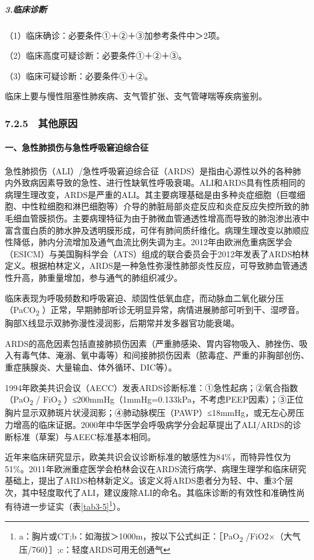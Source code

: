 \subparagraph{3.临床诊断}

（1）临床确诊：必要条件①＋②＋③加参考条件中＞2项。

（2）临床高度可疑诊断：必要条件①＋②＋③。

（3）临床可疑诊断：必要条件①＋②。

临床上要与慢性阻塞性肺疾病、支气管扩张、支气管哮喘等疾病鉴别。

\subsubsection{7.2.5　其他原因}

\paragraph{一、急性肺损伤与急性呼吸窘迫综合征}

急性肺损伤（ALI）/急性呼吸窘迫综合征（ARDS）是指由心源性以外的各种肺内外致病因素导致的急性、进行性缺氧性呼吸衰竭。ALI和ARDS具有性质相同的病理生理改变，ARDS是严重的ALI。其主要病理基础是由多种炎症细胞（巨噬细胞、中性粒细胞和淋巴细胞等）介导的肺脏局部炎症反应和炎症反应失控所致的肺毛细血管膜损伤。主要病理特征为由于肺微血管通透性增高而导致的肺泡渗出液中富含蛋白质的肺水肿及透明膜形成，可伴有肺间质纤维化。病理生理改变以肺顺应性降低，肺内分流增加及通气血流比例失调为主。2012年由欧洲危重病医学会（ESICM）与美国胸科学会（ATS）组成的联合委员会于2012年发表了ARDS柏林定义。根据柏林定义，ARDS是一种急性弥漫性肺部炎性反应，可导致肺血管通透性升高，肺重量增加，参与通气的肺组织减少。

临床表现为呼吸频数和呼吸窘迫、顽固性低氧血症，而动脉血二氧化碳分压（PaCO\textsubscript{2}
）正常，早期肺部听诊无明显异常，病情进展肺部可听到干、湿啰音。胸部X线显示双肺弥漫性浸润影，后期常并发多器官功能衰竭。

ARDS的高危因素包括直接肺损伤因素（严重肺感染、胃内容物吸入、肺挫伤、吸入有毒气体、淹溺、氧中毒等）和间接肺损伤因素（脓毒症、严重的非胸部创伤、重症胰腺炎、大量输血、体外循环、DIC等）。

1994年欧美共识会议（AECC）发表ARDS诊断标准：①急性起病；②氧合指数（PaO\textsubscript{2}
/ FiO\textsubscript{2}
）≤200mmHg（1mmHg=0.133kPa，不考虑PEEP因素）；③正位胸片显示双肺斑片状浸润影；④肺动脉楔压（PAWP）≤18mmHg，或无左心房压力增高的临床证据。2000年中华医学会呼吸病学分会起草提出了ALI/ARDS的诊断标准（草案）与AEEC标准基本相同。

近年来临床研究显示，欧美共识会议诊断标准的敏感性为84\%，而特异性仅为51\%。2011年欧洲重症医学会柏林会议在ARDS流行病学、病理生理学和临床研究基础上，提出了ARDS柏林新定义。该定义将ARDS患者分为轻、中、重3个层次，其中轻度取代了ALI，建议废除ALI的命名。其临床诊断的有效性和准确性尚有待进一步证实（表\ref{tab3-5}\footnote{a：胸片或CT;b：如海拔＞1000m，按以下公式纠正：［PaO\textsubscript{2}
/FiO2×（大气压/760）］;c：轻度ARDS可用无创通气}）。

